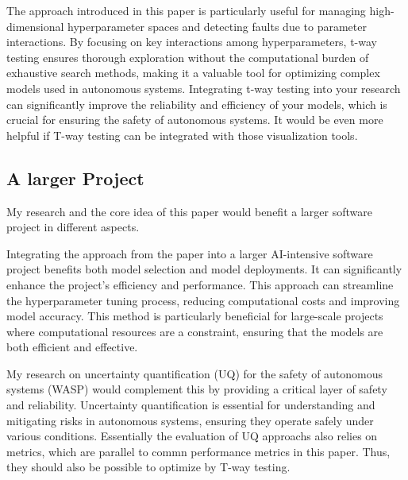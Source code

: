 \documentclass{article}
\begin{document}
The approach introduced in this paper is particularly useful for managing high-dimensional hyperparameter spaces and detecting faults due to parameter interactions.
By focusing on key interactions among hyperparameters, t-way testing ensures thorough exploration without the computational burden of exhaustive search methods, making it a valuable tool for optimizing complex models used in autonomous systems.
Integrating t-way testing into your research can significantly improve the reliability and efficiency of your models, which is crucial for ensuring the safety of autonomous systems.
It would be even more helpful if T-way testing can be integrated with those visualization tools. 


\subsection{A larger Project}

My research and the core idea of this paper would benefit a larger software project in different aspects.

Integrating the approach from the paper into a larger AI-intensive software project benefits both model selection and model deployments.
It can significantly enhance the project's efficiency and performance. This approach can streamline the hyperparameter tuning process, reducing computational costs and improving model accuracy. 
This method is particularly beneficial for large-scale projects where computational resources are a constraint, ensuring that the models are both efficient and effective.

My research on uncertainty quantification (UQ) for the safety of autonomous systems (WASP) would complement this by providing a critical layer of safety and reliability. Uncertainty quantification is essential for understanding and mitigating risks in autonomous systems, ensuring they operate safely under various conditions. 
Essentially the evaluation of UQ approachs also relies on metrics, which are parallel to commn performance metrics in this paper.  
Thus, they should also be possible to optimize by T-way testing. 
\end{document}
